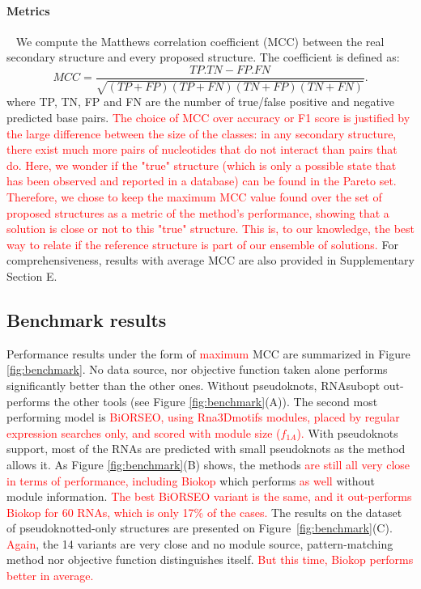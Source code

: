 \documentclass{bioinfo}
\begin{document}
\paragraph{Metrics} ~ We compute the Matthews correlation coefficient (MCC) between the real secondary structure and every proposed structure. 
The coefficient is defined as:
{\small
\begin{equation}
   MCC = \frac{TP. TN - FP. FN}{\sqrt{(TP+FP)(TP+FN)(TN+FP)(TN+FN)}}. \label{eq:MCC}
\end{equation}
}\noindent
where TP, TN, FP and FN are the number of true/false positive and negative predicted base pairs.
\textcolor{red}{The choice of MCC over accuracy or F1 score is justified by the large difference between the size of the classes: in any secondary structure, there exist much more pairs of nucleotides that do not interact than pairs that do.
Here, we wonder if the "true" structure (which is only a possible state that has been observed and reported in a database) can be found in the Pareto set.
Therefore, we chose to keep the maximum MCC value found over the set of proposed structures as a metric of the method's performance, showing that a solution is close or not to this "true" structure. This is, to our knowledge, the best way to relate if the reference structure is part of our ensemble of solutions.} For comprehensiveness, results with average MCC are also provided in Supplementary Section E. 


\subsection{Benchmark results}
Performance results under the form of \textcolor{red}{maximum} MCC are summarized in Figure \ref{fig:benchmark}. No data source, nor objective function taken alone performs significantly better than the other ones.
Without pseudoknots, RNAsubopt out-performs the other tools (see Figure \ref{fig:benchmark}(A)). The second most performing model is \textcolor{red}{BiORSEO, using Rna3Dmotifs modules, placed by regular expression searches only, and scored with module size ($f_{1A}$). } With pseudoknots support, most of the RNAs are predicted with small pseudoknots as the method allows it. As Figure \ref{fig:benchmark}(B) shows, the methods \textcolor{red}{are still all very close in terms of performance, including Biokop} which performs \textcolor{red}{as well} without module information. \textcolor{red}{The best BiORSEO variant is the same, and it out-performs Biokop for 60 RNAs, which is only 17\% of the cases. }
The results on the dataset of pseudoknotted-only structures are presented on Figure~\ref{fig:benchmark}(C).
\textcolor{red}{Again}, the 14 variants are very close and no module source, pattern-matching method nor objective function distinguishes itself. \textcolor{red}{But this time, Biokop performs better in average.}
\end{document}

